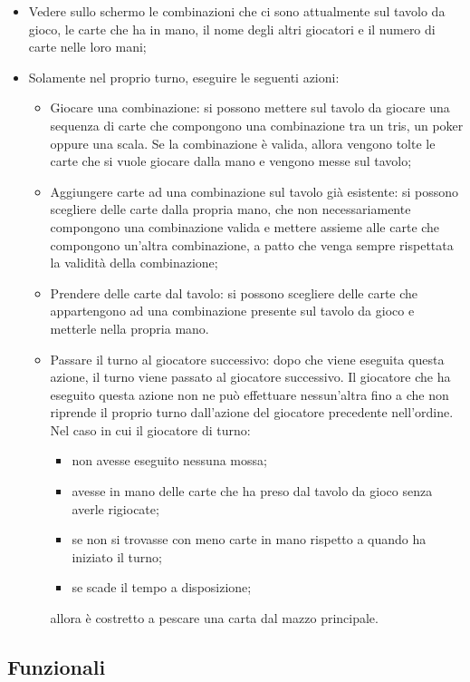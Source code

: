 \begin{itemize}
    \item Vedere sullo schermo le combinazioni che ci sono attualmente sul tavolo da gioco, le carte che ha in mano, il nome degli altri giocatori e il numero di carte nelle loro mani;
    \item Solamente nel proprio turno, eseguire le seguenti azioni:
    \begin{itemize}
        \item Giocare una combinazione: si possono mettere sul tavolo da giocare una sequenza di carte che compongono una combinazione tra un tris, un poker oppure una scala.
        Se la combinazione è valida, allora vengono tolte le carte che si vuole giocare dalla mano e vengono messe sul tavolo;
        \item Aggiungere carte ad una combinazione sul tavolo già esistente: si possono scegliere delle carte dalla propria mano, che non necessariamente compongono una combinazione valida e mettere assieme alle carte che compongono un’altra combinazione, a patto che venga sempre rispettata la validità della combinazione;
        \item Prendere delle carte dal tavolo: si possono scegliere delle carte che appartengono ad una combinazione presente sul tavolo da gioco e metterle nella propria mano.
        \item Passare il turno al giocatore successivo: dopo che viene eseguita questa azione, il turno viene passato al giocatore successivo.
        Il giocatore che ha eseguito questa azione non ne può effettuare nessun’altra fino a che non riprende il proprio turno dall’azione del giocatore precedente nell’ordine.
        Nel caso in cui il giocatore di turno:
        \begin{itemize}
            \item non avesse eseguito nessuna mossa;
            \item avesse in mano delle carte che ha preso dal tavolo da gioco senza averle rigiocate;
            \item se non si trovasse con meno carte in mano rispetto a quando ha iniziato il turno;
            \item se scade il tempo a disposizione;
        \end{itemize}
        allora è costretto a pescare una carta dal mazzo principale.
    \end{itemize}
\end{itemize}

\subsection{Funzionali}

